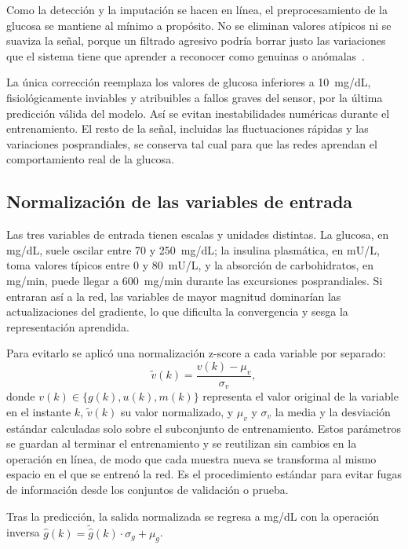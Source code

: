 \documentclass{report}
\begin{document}
Como la detección y la imputación se hacen en línea, el preprocesamiento de la glucosa se mantiene al mínimo a propósito. No se eliminan valores atípicos ni se suaviza la señal, porque un filtrado agresivo podría borrar justo las variaciones que el sistema tiene que aprender a reconocer como genuinas o anómalas~\cite{scholz2004metabolite}.

La única corrección reemplaza los valores de glucosa inferiores a 10~mg/dL, fisiológicamente inviables y atribuibles a fallos graves del sensor, por la última predicción válida del modelo. Así se evitan inestabilidades numéricas durante el entrenamiento. El resto de la señal, incluidas las fluctuaciones rápidas y las variaciones posprandiales, se conserva tal cual para que las redes aprendan el comportamiento real de la glucosa.

\subsection{Normalización de las variables de entrada}
\label{subsec:normalizacion}

Las tres variables de entrada tienen escalas y unidades distintas. La glucosa, en mg/dL, suele oscilar entre 70 y 250~mg/dL; la insulina plasmática, en mU/L, toma valores típicos entre 0 y 80~mU/L, y la absorción de carbohidratos, en mg/min, puede llegar a 600~mg/min durante las excursiones posprandiales. Si entraran así a la red, las variables de mayor magnitud dominarían las actualizaciones del gradiente, lo que dificulta la convergencia y sesga la representación aprendida.

Para evitarlo se aplicó una normalización z-score a cada variable por separado:
\begin{equation}
\label{eq:zscore}
\tilde{v}(k) = \frac{v(k) - \mu_v}{\sigma_v},
\end{equation}
donde $v(k) \in \{g(k), u(k), m(k)\}$ representa el valor original de la variable en el instante $k$, $\tilde{v}(k)$ su valor normalizado, y $\mu_v$ y $\sigma_v$ la media y la desviación estándar calculadas solo sobre el subconjunto de entrenamiento. Estos parámetros se guardan al terminar el entrenamiento y se reutilizan sin cambios en la operación en línea, de modo que cada muestra nueva se transforma al mismo espacio en el que se entrenó la red. Es el procedimiento estándar para evitar fugas de información desde los conjuntos de validación o prueba.

Tras la predicción, la salida normalizada se regresa a mg/dL con la operación inversa $\hat{g}(k) = \tilde{\hat{g}}(k) \cdot \sigma_g + \mu_g$.
\end{document}
